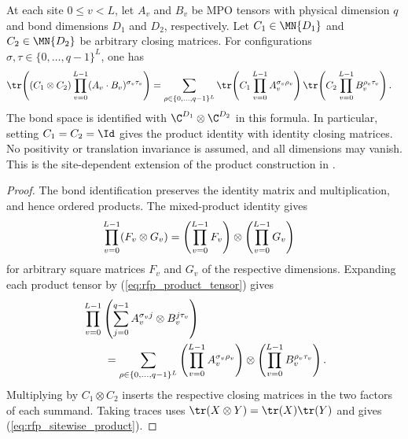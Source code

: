 \begin{lemma}%
    \label{thm:mpdo_sitewise_operator_product}
    \leanok
    At each site $0\leq v<L$, let $A_v$ and $B_v$ be MPO tensors with
    physical dimension $q$ and bond dimensions $D_1$ and $D_2$, respectively.
    Let $C_1\in\MN{D_1}$ and $C_2\in\MN{D_2}$ be arbitrary closing matrices.
    For configurations $\sigma,\tau\in\{0,\ldots,q-1\}^L$, one has
    \begin{align}
        \tr\!\left((C_1\otimes C_2)
        \prod_{v=0}^{L-1}(A_v\mathbin{\cdot}B_v)^{\sigma_v\tau_v}\right)
         & =\sum_{\rho\in\{0,\ldots,q-1\}^L}
        \tr\!\left(C_1\prod_{v=0}^{L-1}A_v^{\sigma_v\rho_v}\right)
        \tr\!\left(C_2\prod_{v=0}^{L-1}B_v^{\rho_v\tau_v}\right).
        \label{eq:rfp_sitewise_product}
    \end{align}
    The bond space is identified with $\C^{D_1}\otimes\C^{D_2}$ in this
    formula. In particular, setting $C_1=C_2=\Id$ gives the product identity
    with identity closing matrices. No positivity or translation invariance
    is assumed, and all dimensions may vanish. This is the site-dependent
    extension of the product construction in
    \cite[Section~4.5]{Cirac2016MPDO_arXiv}.
\end{lemma}
\begin{proof}\leanok
    The bond identification preserves the identity matrix and multiplication,
    and hence ordered products. The mixed-product identity gives
    \begin{align}
        \prod_{v=0}^{L-1}(F_v\otimes G_v)
         & =\left(\prod_{v=0}^{L-1}F_v\right)
        \otimes\left(\prod_{v=0}^{L-1}G_v\right)
        \notag
    \end{align}
    for arbitrary square matrices $F_v$ and $G_v$ of the respective dimensions.
    Expanding each product tensor by (\ref{eq:rfp_product_tensor}) gives
    \begin{align}
         & \prod_{v=0}^{L-1}\left(\sum_{j=0}^{q-1}
        A_v^{\sigma_v j}\otimes B_v^{j\tau_v}\right)\notag \\
         & \qquad=\sum_{\rho\in\{0,\ldots,q-1\}^L}
        \left(\prod_{v=0}^{L-1}A_v^{\sigma_v\rho_v}\right)
        \otimes\left(\prod_{v=0}^{L-1}B_v^{\rho_v\tau_v}\right).
        \notag
    \end{align}
    Multiplying by $C_1\otimes C_2$ inserts the respective closing matrices
    in the two factors of each summand.
    Taking traces uses $\tr(X\otimes Y)=\tr(X)\tr(Y)$ and gives
    (\ref{eq:rfp_sitewise_product}).
\end{proof}

